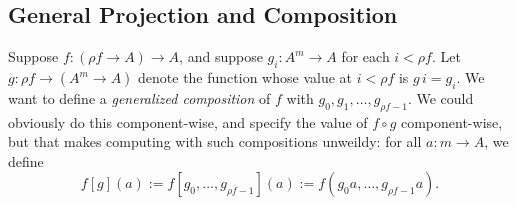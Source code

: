 \documentclass[12pt]{amsart}  %
\begin{document}
\ifextver


\subsection{General Projection and Composition}
Suppose $f \colon (\rho f \to A) \to A$, and suppose 
$g_i \colon A^m \to A$ for each $i <\rho f$.
Let $g \colon \rho f \to (A^m \to A)$ denote
the function whose value at $i < \rho f$ is 
$g\, i = g_i$. We want to define a \emph{generalized composition} of $f$ 
with $g_0, g_1, \dots, g_{\rho f -1}$.  We could obviously do this component-wise,
and specify the value of $f \circ g$ component-wise,
but that makes computing with such compositions unweildy: for all $a : m \to A$, we define
\[
  f [g](a) := f[g_0, \dots, g_{\rho f -1}](a) := f (g_0 a, \dots, g_{\rho f-1} a).
  \]
\end{document}
